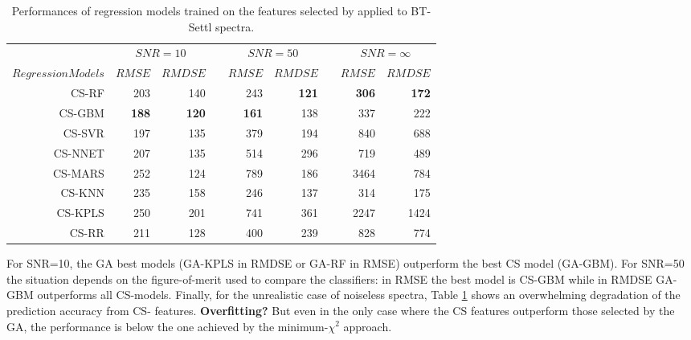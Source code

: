 \begin{table}
\begin{center}
\begin{tabular}{@{}rrrcrrcrr@{}}\toprule
& \multicolumn{2}{c}{$SNR = 10$} & \phantom{ab}& \multicolumn{2}{c}{$SNR = 50$} &
\phantom{ab} & \multicolumn{2}{c}{$SNR = \infty$}\\
\cmidrule{2-3} \cmidrule{5-6} \cmidrule{8-9}
$Regression Models$ & $RMSE$ & $RMDSE$ && $RMSE$ & $RMDSE$     && $RMSE$       & $RMDSE$ \\ \midrule
CS-RF   & 203       & 140       && 243       & {\bf 121} &&  {\bf 306} &  {\bf 172}  \\
CS-GBM  & {\bf 188} & {\bf 120} && {\bf 161} & 138       &&  337       &  222  \\
CS-SVR  & 197       & 135       && 379       & 194       &&  840       &  688  \\
CS-NNET & 207       & 135       && 514       & 296       &&  719       &  489  \\
CS-MARS & 252       & 124       && 789       & 186       && 3464       &  784  \\
CS-KNN  & 235       & 158       && 246       & 137       &&  314       &  175  \\
CS-KPLS & 250       & 201       && 741       & 361       && 2247       & 1424  \\
CS-RR   & 211       & 128       && 400       & 239       &&  828       &  774  \\

\hline
\end{tabular}
\caption {Performances of regression models trained on the features
  selected by \cite{cesetti} applied to BT-Settl spectra.}
\label{tab:tab_CS_Model}
\end{center}
\end{table}

For SNR=10, the GA best models (GA-KPLS in RMDSE or GA-RF in RMSE)
outperform the best CS model (GA-GBM). For SNR=50 the situation
depends on the figure-of-merit used to compare the classifiers: in
RMSE the best model is CS-GBM while in RMDSE GA-GBM outperforms all
CS-models. Finally, for the unrealistic case of noiseless spectra,
Table \ref{tab:tab_CS_Model} shows an overwhelming degradation of the
prediction accuracy from CS- features. {\bf Overfitting?} But even in
the only case where the CS features outperform those selected by the
GA, the performance is below the one achieved by the minimum-$\chi^2$
approach.


